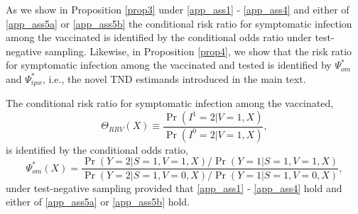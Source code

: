 \begin{appendix}
\begin{refsection}
    As we show in Proposition \ref{prop3} under \ref{app_ass1} - \ref{app_ass4} and either of \ref{app_ass5a} or \ref{app_ass5b} the conditional risk ratio for symptomatic infection among the vaccinated is identified by the conditional odds ratio under test-negative sampling. Likewise, in Proposition \ref{prop4}, we show that the risk ratio for symptomatic infection among the vaccinated and tested is identified by $\Psi^*_{om}$ and $\Psi^*_{ipw}$, i.e., the novel TND estimands introduced in the main text.
    \newpage
    
    \begin{proposition}\label{prop3}
    The conditional risk ratio for symptomatic infection among the vaccinated, 
    \[\Theta_{RRV}(X) \equiv \dfrac{\Pr(I^1 = 2 | V = 1, X)}{\Pr(I^0 = 2| V = 1, X)},\]
    is identified by the conditional odds ratio, 
    \begin{equation}
    \Psi^*_{om}(X) = \dfrac{\Pr(Y = 2 | S = 1, V = 1, X)/\Pr(Y = 1 | S = 1, V = 1, X)}{\Pr(Y = 2 | S = 1, V = 0, X)/\Pr(Y = 1 | S = 1, V = 0, X)},
    \end{equation}  
    under test-negative sampling provided that \ref{app_ass1} - \ref{app_ass4} hold and either of \ref{app_ass5a} or \ref{app_ass5b} hold.
    

\end{proposition}
\end{refsection}
\end{appendix}
